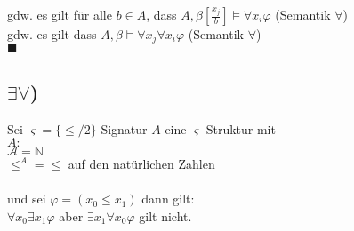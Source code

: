 gdw. es gilt für alle $b \in A$, dass $A,\beta[\frac{x_j}{b}] \vDash \forall x_i \varphi$ (Semantik $\forall$)\\

gdw. es gilt dass $A,\beta \vDash \forall x_j \forall x_i \varphi$ (Semantik $\forall$)\\
$\blacksquare$

\subsection*{$\exists \forall$)}
Sei $\varsigma=\{\leq/2\}$ Signatur $A$ eine $\varsigma$-Struktur mit\\ $A:$\\
$\mathcal{A}=\mathbb{N}$\\
 $\leq^A =  \leq$ auf den natürlichen Zahlen\\
\\
 und sei $\varphi = (x_0 \leq x_1)$ dann gilt:\\
$\forall x_0 \exists x_1 \varphi$ aber $\exists x_1 \forall x_0 \varphi$ gilt nicht. 
 

